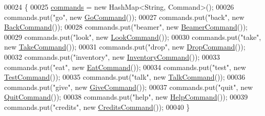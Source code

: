 \begin{DoxyCode}
00024                           \{
00025         \hyperlink{classpkg__parsing_1_1CommandWords_a82467831861a15539131a50c22e826fc}{commands} = \textcolor{keyword}{new} HashMap<String, Command>();
00026         commands.put(\textcolor{stringliteral}{"go"}, \textcolor{keyword}{new} \hyperlink{classpkg__commands_1_1GoCommand}{GoCommand}());
00027         commands.put(\textcolor{stringliteral}{"back"}, \textcolor{keyword}{new} \hyperlink{classpkg__commands_1_1BackCommand}{BackCommand}());
00028         commands.put(\textcolor{stringliteral}{"beamer"}, \textcolor{keyword}{new} \hyperlink{classpkg__commands_1_1BeamerCommand}{BeamerCommand}());
00029         commands.put(\textcolor{stringliteral}{"look"}, \textcolor{keyword}{new} \hyperlink{classpkg__commands_1_1LookCommand}{LookCommand}());
00030         commands.put(\textcolor{stringliteral}{"take"}, \textcolor{keyword}{new} \hyperlink{classpkg__commands_1_1TakeCommand}{TakeCommand}());
00031         commands.put(\textcolor{stringliteral}{"drop"}, \textcolor{keyword}{new} \hyperlink{classpkg__commands_1_1DropCommand}{DropCommand}());
00032         commands.put(\textcolor{stringliteral}{"inventory"}, \textcolor{keyword}{new} \hyperlink{classpkg__commands_1_1InventoryCommand}{InventoryCommand}());
00033         commands.put(\textcolor{stringliteral}{"eat"}, \textcolor{keyword}{new} \hyperlink{classpkg__commands_1_1EatCommand}{EatCommand}());
00034         commands.put(\textcolor{stringliteral}{"test"}, \textcolor{keyword}{new} \hyperlink{classpkg__commands_1_1TestCommand}{TestCommand}());
00035         commands.put(\textcolor{stringliteral}{"talk"}, \textcolor{keyword}{new} \hyperlink{classpkg__commands_1_1TalkCommand}{TalkCommand}());
00036         commands.put(\textcolor{stringliteral}{"give"}, \textcolor{keyword}{new} \hyperlink{classpkg__commands_1_1GiveCommand}{GiveCommand}());
00037         commands.put(\textcolor{stringliteral}{"quit"}, \textcolor{keyword}{new} \hyperlink{classpkg__commands_1_1QuitCommand}{QuitCommand}());
00038         commands.put(\textcolor{stringliteral}{"help"}, \textcolor{keyword}{new} \hyperlink{classpkg__commands_1_1HelpCommand}{HelpCommand}());
00039         commands.put(\textcolor{stringliteral}{"credits"}, \textcolor{keyword}{new} \hyperlink{classpkg__commands_1_1CreditsCommand}{CreditsCommand}());
00040     \}
\end{DoxyCode}


